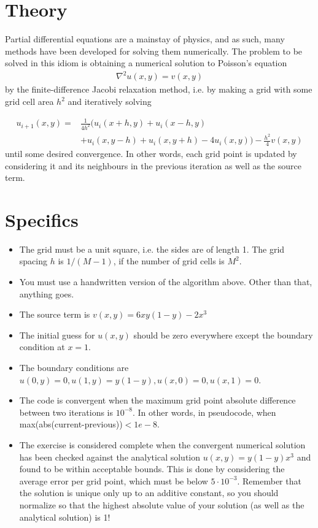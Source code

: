 \documentclass[12pt]{article}
\begin{document}
\maketitle
\section{Theory}
Partial differential equations are a mainstay of physics, and as such, many methods have been developed for solving them numerically. The problem to be solved in this idiom is obtaining a numerical solution to Poisson's equation
\begin{align}
\nabla ^2 u(x,y) = v(x,y)
\end{align}
by the finite-difference Jacobi relaxation method, i.e. by making a grid with some grid cell area $h^2$ and iteratively solving

\begin{align}
u_{i+1}(x,y) = &\frac{1}{4h^2}\bigg( u_i(x+h,y) + u_i(x-h,y)\\
 &+ u_i(x,y-h) + u_i(x,y+h) - 4u_i(x,y)\bigg) - \frac{h^2}{4}v(x,y)
\end{align}
until some desired convergence. In other words, each grid point is updated by considering it and its neighbours in the previous iteration as well as the source term.
\section{Specifics}
\begin{itemize}
\item The grid must be a unit square, i.e. the sides are of length 1. The grid spacing $h$ is $1/(M-1)$, if the number of grid cells is $M^2$.
\item You must use a handwritten version of the algorithm above. Other than that, anything goes.
\item The source term is $v(x,y) = 6xy(1-y)-2x^3$
\item The initial guess for $u(x,y)$ should be zero everywhere except the boundary condition at $x=1$.
\item The boundary conditions are $u(0,y) = 0, u(1,y) = y(1-y), u(x,0) = 0, u(x,1) = 0$.
\item The code is convergent when the maximum grid point absolute difference between two iterations is $10^{-8}$. In other words, in pseudocode, when max(abs(current-previous))$<1e-8$.
\item The exercise is considered complete when the convergent numerical solution has been checked against the analytical solution $u(x,y) = y(1-y)x^3$ and found to be within acceptable bounds. This is done by considering the average error per grid point, which must be below $5\cdot 10^{-3}$. Remember that the solution is unique only up to an additive constant, so you should normalize so that the highest absolute value of your solution (as well as the analytical solution) is 1!

\end{itemize}
\end{document}
